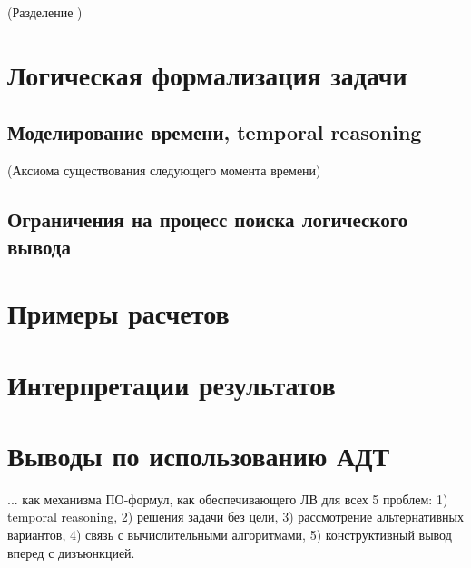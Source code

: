 (Разделение )

\section{Логическая формализация задачи}

\subsection{Моделирование времени, temporal reasoning}
(Аксиома существования следующего момента времени)

\subsection{Ограничения на процесс поиска логического вывода}


\section{Примеры расчетов}


\section{Интерпретации результатов}

\section{Выводы по использованию АДТ}

... как механизма ПО-формул, как обеспечивающего ЛВ для всех 5 проблем: 1) temporal reasoning, 2) решения задачи без цели, 3) рассмотрение альтернативных вариантов, 4) связь с вычислительными алгоритмами, 5) конструктивный вывод вперед с дизъюнкцией.
